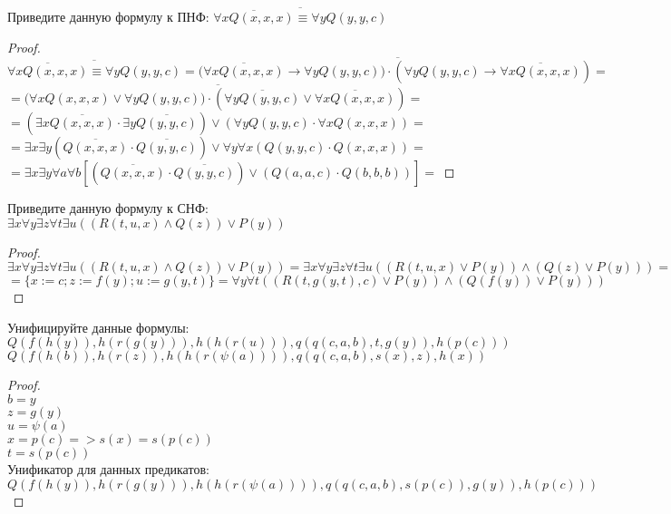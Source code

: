 \begin{problem}
Приведите данную формулу к ПНФ:
$\overline{\overline{\forall xQ(x, x, x)} \equiv \forall y Q(y, y, c)}$
\end{problem}
\begin{proof} $ $\\
$\overline{\overline{\forall xQ(x, x, x)} \equiv \forall y Q(y, y, c)} = 
(\overline{\overline{\forall xQ(x, x, x)} \rightarrow \forall y Q(y, y, c)) \cdot (\forall y Q(y, y, c) \rightarrow \overline{\forall xQ(x, x, x)})} =$\\
$= (\overline{\forall xQ(x, x, x) \vee \forall y Q(y, y, c)) \cdot (\overline{\forall y Q(y, y, c)} \vee \overline{\forall xQ(x, x, x)})} =$\\
$= (\exists x \overline{Q(x, x, x)} \cdot \exists y\overline{Q(y ,y, c)}) \vee (\forall yQ(y ,y, c) \cdot \forall xQ(x, x, x)) =$\\
$= \exists x \exists y( \overline{Q(x, x, x)} \cdot \overline{Q(y ,y, c)}) \vee \forall y  \forall x(Q(y ,y, c) \cdot Q(x, x, x)) =$\\
$= \exists x \exists y \forall a \forall b [( \overline{Q(x, x, x)} \cdot \overline{Q(y ,y, c)}) \vee (Q(a, a, c) \cdot Q(b, b, b))] =$
\end{proof}


\begin{problem}
Приведите данную формулу к СНФ:\\
$\exists x \forall y \exists z \forall t \exists u ((R(t, u, x) \wedge Q(z)) \vee P(y))$
\end{problem}
\begin{proof} $ $\\
$\exists x \forall y \exists z \forall t \exists u ((R(t, u, x) \wedge Q(z)) \vee P(y)) = \exists x \forall y \exists z \forall t \exists u ((R(t, u, x) \vee P(y)) \wedge (Q(z) \vee P(y))) =$\\
$= \{x := c; z := f(y); u := g(y, t)\} = \forall y \forall t ((R(t, g(y, t), c) \vee P(y)) \wedge (Q(f(y)) \vee P(y)))$
\end{proof}


\begin{problem}
Унифицируйте данные формулы:\\
$Q(f(h(y)), h(r(g(y))), h(h(r(u))), q(q(c, a, b), t, g(y)), h(p(c)))$\\
$Q(f(h(b)), h(r(z)), h(h(r(\psi(a)))), q(q(c, a, b), s(x), z), h(x))$
\end{problem}
\begin{proof} $ $\\
$b = y$\\
$z = g(y)$\\
$u = \psi(a)$\\
$x = p(c) => s(x) = s(p(c))$\\
$t = s(p(c))$\\
Унификатор для данных предикатов:\\
$Q( f(h(y)), h(r(g(y))), h(h(r(\psi(a)))), q(q(c, a, b), s(p(c)), g(y)), h(p(c)) )$
\end{proof}


